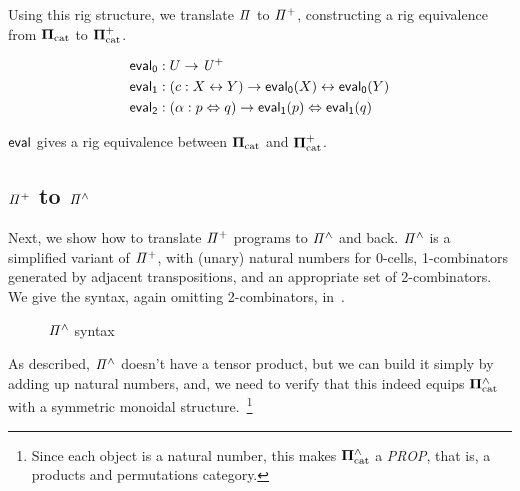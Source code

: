 \noindent Using this rig structure, we translate $\mathit{\Pi}$ to $\mathit{{\Pi}^{+}}$, constructing a rig equivalence from
$\mathbf{\Pi}_{\mathrm{cat}}$ to $\mathbf{\Pi}^{+}_{\mathrm{cat}}$.

\begin{definition}[$\evalt$]
  \begin{align*}
    \evalt_{0} & : U \to \UPlus                                             \\
    \evalt_{1} & : (c : X \iso Y) \to \evalt_{0}(X) \iso \evalt_{0}(Y)      \\
    \evalt_{2} & : (\alpha : p \Iso q) \to \evalt_{1}(p) \Iso \evalt_{1}(q)
  \end{align*}
\end{definition}

\begin{theorem}
  $\evalt$ gives a rig equivalence between $\mathbf{\Pi}_{\mathrm{cat}}$ and $\mathbf{\Pi}^{+}_{\mathrm{cat}}$.
\end{theorem}

\subsection{$\mathit{{\Pi}^{+}}$ to $\mathit{{\Pi}^{\wedge}}$}

Next, we show how to translate $\mathit{{\Pi}^{+}}$ programs to $\mathit{{\Pi}^{\wedge}}$ and back. $\mathit{{\Pi}^{\wedge}}$ is a simplified variant of
$\mathit{{\Pi}^{+}}$, with (unary) natural numbers for 0-cells, 1-combinators generated by adjacent transpositions, and an
appropriate set of 2-combinators. We give the syntax, again omitting 2-combinators, in~.

\begin{figure}[t]
  {}

  {}
  \caption{$\mathit{{\Pi}^{\wedge}}$ syntax}
  \label{fig:pihat}
\end{figure}

As described, $\mathit{{\Pi}^{\wedge}}$ doesn't have a tensor product, but we can build it simply by adding up natural numbers, and,
we need to verify that this indeed equips $\mathbf{\Pi}^{\wedge}_{\mathrm{cat}}$ with a symmetric monoidal structure.~\footnote{Since each object
is a natural number, this makes $\mathbf{\Pi}^{\wedge}_{\mathrm{cat}}$ a \emph{PROP}, that is, a products and permutations category.}

